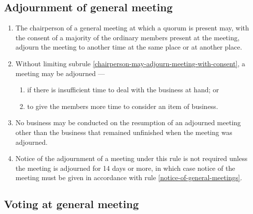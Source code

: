 \documentclass[../constitution.tex]{subfiles}
\begin{document}
\hypertarget{adjournment-of-general-meeting}{%
\subsection{Adjournment of general meeting}\label{adjournment-of-general-meeting}}

\begin{enumerate}

\item The chairperson of a general meeting at which a quorum is present may, with the consent of a majority of the ordinary members present at the meeting, adjourn the meeting to another time at the same place or at another place. \label{chairperson-may-adjourn-meeting-with-consent}
\item Without limiting subrule \ref{chairperson-may-adjourn-meeting-with-consent}, a meeting may be adjourned ---

  \begin{enumerate}
  
  \item if there is insufficient time to deal with the business at hand; or
  \item to give the members more time to consider an item of business.
  \end{enumerate}
\item No business may be conducted on the resumption of an adjourned meeting other than the business that remained unfinished when the meeting was adjourned.
\item Notice of the adjournment of a meeting under this rule is not required unless the meeting is adjourned for 14 days or more, in which case notice of the meeting must be given in accordance with rule \ref{notice-of-general-meetings}.
\end{enumerate}

\hypertarget{voting-at-general-meeting}{%
\subsection{Voting at general meeting}\label{voting-at-general-meeting}}
\end{document}
